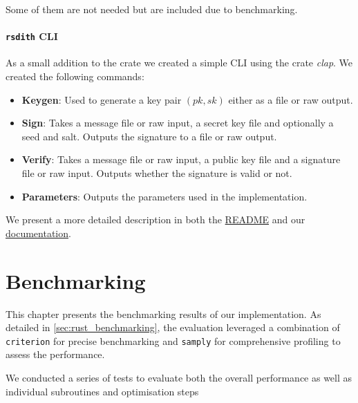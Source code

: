 \documentclass[11pt]{report}
\theoremstyle{definition}
\theoremstyle{plain}
\begin{document}
Some of them are not needed but are included due to benchmarking.

\subsubsection{\texttt{rsdith} CLI}
As a small addition to the crate we created a simple CLI using the crate \textit{clap}. We created the following commands:
\begin{itemize}
  \item \textbf{Keygen}: Used to generate a key pair $(pk,sk)$ either as a file or raw output.
  \item \textbf{Sign}: Takes a message file or raw input, a secret key file and optionally a seed and salt. Outputs the signature to a file or raw output.
  \item \textbf{Verify}: Takes a message file or raw input, a public key file and a signature file or raw input. Outputs whether the signature is valid or not.
  \item \textbf{Parameters}: Outputs the parameters used in the implementation.
\end{itemize}

We present a more detailed description in both the \href{https://github.com/Mactherobot/sdith-rust/blob/main/sdith/README.md}{README} and our \href{https://mactherobot.github.io/sdith-rust/sdith/index.html}{documentation}.

\chapter{Benchmarking}\label{ch:bench}

This chapter presents the benchmarking results of our implementation. As detailed in \autoref{sec:rust_benchmarking}, the evaluation leveraged a combination of \texttt{criterion} for precise benchmarking and \texttt{samply} for comprehensive profiling to assess the performance.

We conducted a series of tests to evaluate both the overall performance as well as individual subroutines and optimisation steps
\end{document}
